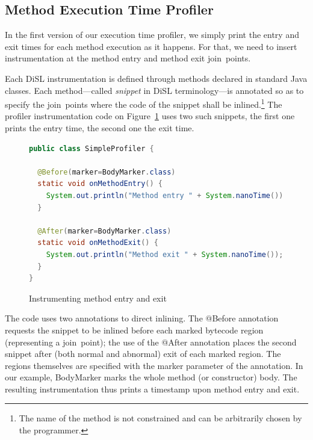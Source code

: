 \documentclass{article}
\newcommand{\brcode}[1]{\textsf{#1}}
\newcommand{\code}[1]{\mbox{\brcode{#1}}}
\begin{document}
\subsection{Method Execution Time Profiler}


In the first version of our execution time profiler, we simply print the entry and exit times for each method execution as it happens.
For that, we need to insert instrumentation at the method entry and method exit join~points.

Each DiSL instrumentation is defined through methods declared in standard Java classes.
Each method---called {\em snippet} in DiSL terminology---is annotated so as to specify the join~points where the code of the snippet shall be inlined.\footnote{The name of the method is not constrained and can be arbitrarily chosen by the programmer.}
The profiler instrumentation code on Figure~\ref{fig:instr-prof-simple-prof} uses two such snippets, the first one prints the entry time, the second one the exit time.

\begin{figure}[h!]
\smaller
\begin{lstlisting}[language=Java]
public class SimpleProfiler {

  @Before(marker=BodyMarker.class)
  static void onMethodEntry() {
    System.out.println("Method entry " + System.nanoTime());
  }

  @After(marker=BodyMarker.class)
  static void onMethodExit() {
    System.out.println("Method exit " + System.nanoTime());
  }
}
\end{lstlisting}
\caption{Instrumenting method entry and exit}
\label{fig:instr-prof-simple-prof}
\end{figure}

The code uses two annotations to direct inlining.
The \code{@Before} annotation requests the snippet to be inlined before each marked bytecode region (representing a join~point); the use of the \code{@After} annotation places the second snippet after (both normal and abnormal) exit of each marked region.
The regions themselves are specified with the \code{marker} parameter of the annotation.
In our example, \code{BodyMarker} marks the whole method (or constructor) body.
The resulting instrumentation thus prints a timestamp upon method entry and exit.
\end{document}
